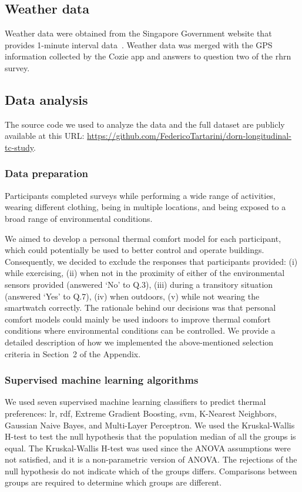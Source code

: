 \subsection{Weather data}\label{subsec:weather-data}
Weather data were obtained from the Singapore Government website that provides 1-minute interval data~\cite{DataGovSGWeather}.
Weather data was merged with the GPS information collected by the Cozie app and answers to question two of the \ac{rhrn} survey.

\subsection{Data analysis}\label{subsec:data-analysis}
The source code we used to analyze the data and the full dataset are publicly available at this URL: \url{https://github.com/FedericoTartarini/dorn-longitudinal-tc-study}.

\subsubsection{Data preparation}\label{subsubsec:data-preparation}
Participants completed surveys while performing a wide range of activities, wearing different clothing, being in multiple locations, and being exposed to a broad range of environmental conditions.

We aimed to develop a personal thermal comfort model for each participant, which could potentially be used to better control and operate buildings.
Consequently, we decided to exclude the responses that participants provided:
(i) while exercising,
(ii) when not in the proximity of either of the environmental sensors provided (answered `No' to Q.3),
(iii) during a transitory situation (answered `Yes' to Q.7),
(iv) when outdoors,
(v) while not wearing the smartwatch correctly.
The rationale behind our decisions was that personal comfort models could mainly be used indoors to improve thermal comfort conditions where environmental conditions can be controlled.
We provide a detailed description of how we implemented the above-mentioned selection criteria in Section~2 of the Appendix.

\subsubsection{Supervised machine learning algorithms}\label{subsubsec:alogorithms}
We used seven supervised machine learning classifiers to predict thermal preferences: \gls{lr}, \gls{rdf}, Extreme Gradient Boosting, \ac{svm}, K-Nearest Neighbors, Gaussian Naive Bayes, and Multi-Layer Perceptron.
We used the Kruskal-Wallis H-test to test the null hypothesis that the population median of all the groups is equal.
The Kruskal-Wallis H-test was used since the ANOVA assumptions were not satisfied, and it is a non-parametric version of ANOVA.\@
The rejections of the null hypothesis do not indicate which of the groups differs. 
Comparisons between groups are required to determine which groups are different.

